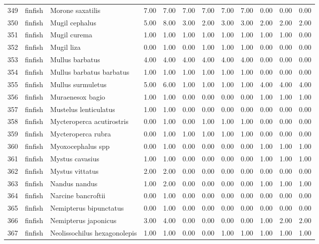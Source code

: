 \begin{table}[ht]
\begin{tabular}{rllrrrrrrrrr}
  349 & finfish & Morone saxatilis & 7.00 & 7.00 & 7.00 & 7.00 & 7.00 & 7.00 & 0.00 & 0.00 & 0.00 \\ 
  350 & finfish & Mugil cephalus & 5.00 & 8.00 & 3.00 & 2.00 & 3.00 & 3.00 & 2.00 & 2.00 & 2.00 \\ 
  351 & finfish & Mugil curema & 1.00 & 1.00 & 1.00 & 1.00 & 1.00 & 1.00 & 1.00 & 1.00 & 0.00 \\ 
  352 & finfish & Mugil liza & 0.00 & 1.00 & 0.00 & 1.00 & 1.00 & 1.00 & 0.00 & 0.00 & 0.00 \\ 
  353 & finfish & Mullus barbatus & 4.00 & 4.00 & 4.00 & 4.00 & 4.00 & 4.00 & 0.00 & 0.00 & 0.00 \\ 
  354 & finfish & Mullus barbatus barbatus & 1.00 & 1.00 & 1.00 & 1.00 & 1.00 & 1.00 & 0.00 & 0.00 & 0.00 \\ 
  355 & finfish & Mullus surmuletus & 5.00 & 6.00 & 1.00 & 1.00 & 1.00 & 1.00 & 4.00 & 4.00 & 4.00 \\ 
  356 & finfish & Muraenesox bagio & 1.00 & 1.00 & 0.00 & 0.00 & 0.00 & 0.00 & 1.00 & 1.00 & 1.00 \\ 
  357 & finfish & Mustelus lenticulatus & 1.00 & 1.00 & 0.00 & 0.00 & 0.00 & 0.00 & 0.00 & 0.00 & 0.00 \\ 
  358 & finfish & Mycteroperca acutirostris & 0.00 & 1.00 & 0.00 & 1.00 & 1.00 & 1.00 & 0.00 & 0.00 & 0.00 \\ 
  359 & finfish & Mycteroperca rubra & 0.00 & 1.00 & 1.00 & 1.00 & 1.00 & 1.00 & 0.00 & 0.00 & 0.00 \\ 
  360 & finfish & Myoxocephalus spp & 0.00 & 1.00 & 0.00 & 0.00 & 0.00 & 0.00 & 1.00 & 1.00 & 1.00 \\ 
  361 & finfish & Mystus cavasius & 1.00 & 1.00 & 0.00 & 0.00 & 0.00 & 0.00 & 1.00 & 1.00 & 1.00 \\ 
  362 & finfish & Mystus vittatus & 2.00 & 2.00 & 0.00 & 0.00 & 0.00 & 0.00 & 0.00 & 0.00 & 0.00 \\ 
  363 & finfish & Nandus nandus & 1.00 & 2.00 & 0.00 & 0.00 & 0.00 & 0.00 & 1.00 & 1.00 & 1.00 \\ 
  364 & finfish & Narcine bancroftii & 0.00 & 1.00 & 0.00 & 0.00 & 0.00 & 0.00 & 0.00 & 0.00 & 0.00 \\ 
  365 & finfish & Nemipterus bipunctatus & 0.00 & 1.00 & 0.00 & 0.00 & 0.00 & 0.00 & 0.00 & 0.00 & 0.00 \\ 
  366 & finfish & Nemipterus japonicus & 3.00 & 4.00 & 0.00 & 0.00 & 0.00 & 0.00 & 1.00 & 2.00 & 2.00 \\ 
  367 & finfish & Neolissochilus hexagonolepis & 1.00 & 1.00 & 0.00 & 0.00 & 1.00 & 1.00 & 1.00 & 1.00 & 1.00 \\ 

\end{tabular}
\end{table}
